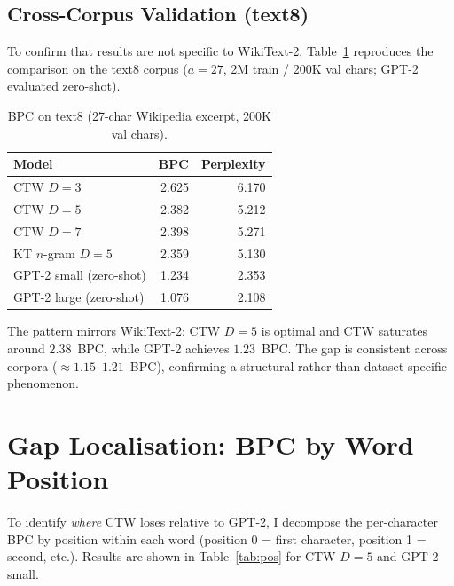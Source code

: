 \documentclass[11pt,a4paper]{article}
\begin{document}
\subsection{Cross-Corpus Validation (text8)}
\label{ssec:text8}

To confirm that results are not specific to WikiText-2,
Table~\ref{tab:ptb} reproduces the comparison on the text8 corpus
($a=27$, 2M train / 200K val chars; GPT-2 evaluated zero-shot).

\begin{table}[H]
\centering
\caption{BPC on text8 (27-char Wikipedia excerpt, 200K val chars).}
\label{tab:ptb}
{\small
\begin{tabular}{lrr}
\toprule
\textbf{Model} & \textbf{BPC} & \textbf{Perplexity}\\
\midrule
CTW $D=3$               & 2.625 & 6.170 \\
CTW $D=5$               & 2.382 & 5.212 \\
CTW $D=7$               & 2.398 & 5.271 \\
\midrule
KT $n$-gram $D=5$       & 2.359 & 5.130 \\
\midrule
GPT-2 small (zero-shot) & 1.234 & 2.353 \\
GPT-2 large (zero-shot) & 1.076 & 2.108 \\
\bottomrule
\end{tabular}}
\end{table}

The pattern mirrors WikiText-2: CTW $D=5$ is optimal and CTW saturates
around $2.38$~BPC, while GPT-2 achieves $1.23$~BPC.
The gap is consistent across corpora ($\approx 1.15$--$1.21$~BPC),
confirming a structural rather than dataset-specific phenomenon.

\section{Gap Localisation: BPC by Word Position}
\label{sec:gap}

To identify \emph{where} CTW loses relative to GPT-2,
I decompose the per-character BPC by position within each word
(position 0 = first character, position 1 = second, etc.).
Results are shown in Table~\ref{tab:pos} for CTW $D=5$ and GPT-2 small.
\end{document}
